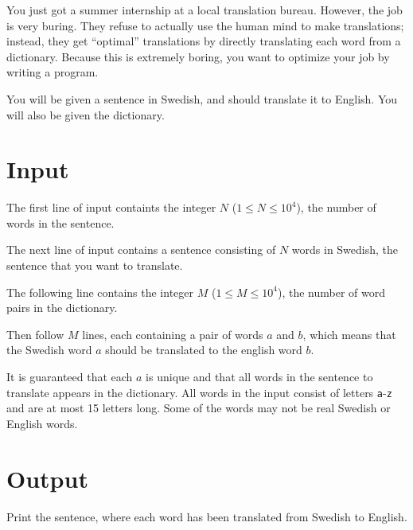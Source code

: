 You just got a summer internship at a local translation bureau. However, the job is very buring. They refuse
to actually use the human mind to make translations; instead, they get ``optimal'' translations by directly
translating each word from a dictionary. Because this is extremely boring, you want to optimize your job
by writing a program.

You will be given a sentence in Swedish, and should translate it to English. You will also be given the
dictionary.

\section*{Input}
The first line of input containts the integer $N$ ($1 \leq N \leq 10^4$), the number of words in the
sentence.

The next line of input contains a sentence consisting of $N$ words in Swedish, the sentence that
you want to translate.

The following line contains the integer $M$ ($1 \leq M \leq 10^4$), the number of word pairs in the dictionary.

Then follow $M$ lines, each containing a pair of words $a$ and $b$, which means that the Swedish word
$a$ should be translated to the english word $b$.

It is guaranteed that each $a$ is unique and that all words in the sentence to translate appears in the dictionary.
All words in the input consist of letters \texttt{a}-\texttt{z} and are at most 15 letters long.
Some of the words may not be real Swedish or English words.

\section*{Output}
Print the sentence, where each word has been translated from Swedish to English.
